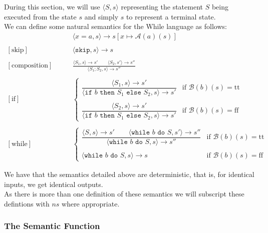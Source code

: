 \documentclass[a4paper, 12pt, twoside]{article}
\begin{document}
During this section, we will use $\langle S, s\rangle$
representing the statement $S$ being executed from the state $s$ and
simply $s$ to represent a terminal state.
\\[\baselineskip]
We can define some natural semantics for the While language as follows:
\begin{align*}
  [\text{assignment}]& \qquad \langle x=a, s \rangle \to s[x\mapsto \mathcal{A}(a)(s)] \\ \\
  [\text{skip}]& \qquad \langle \texttt{skip}, s \rangle \to s \\ \\
  [\text{composition}]& \qquad \frac{
    \langle S_1, s \rangle \to s' \qquad \langle S_2, s' \rangle \to s''
  }{\langle S_1;S_2, s \rangle \to s''} \\ \\
  [\text{if}]& \qquad \begin{cases}
    \dfrac{
      \langle S_1, s \rangle \to s'
    }{
      \langle \texttt{if } b \texttt{ then } S_1 \texttt{ else } S_2, s \rangle \to s'
    } & \text{if } \mathcal{B}(b)(s) = \text{tt} \\ \\
    \dfrac{
      \langle S_2, s \rangle \to s'
    }{
      \langle \texttt{if } b \texttt{ then } S_1 \texttt{ else } S_2, s \rangle \to s'
    } & \text{if } \mathcal{B}(b)(s) = \text{ff}
  \end{cases} \\ \\
  [\text{while}]& \qquad \begin{cases}
    \dfrac{
      \langle S, s \rangle \to s' \qquad \langle 
      \texttt{while } b \texttt{ do } S, s' \rangle \to s''
    }{
      \langle \texttt{while } b \texttt{ do } S, s \rangle \to s''
    } & \text{if } \mathcal{B}(b)(s) = \text{tt} \\ \\
    \langle \texttt{while } b \texttt{ do } S, s \rangle \to s
    & \text{if } \mathcal{B}(b)(s) = \text{ff}
  \end{cases}
\end{align*}

We have that the semantics detailed above are deterministic, that is,
for identical inputs, we get identical outputs.
\\[\baselineskip]
As there is more than one definition of these semantics
we will subscript these defintions with $ns$ where appropriate.

\subsubsection{The Semantic Function}
\end{document}
